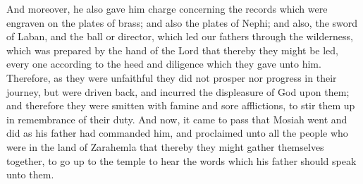 And moreover, he also gave him charge concerning the records which were engraven on the plates of brass; and also the plates of Nephi; and also, the sword of Laban, and the ball or director, which led our fathers through the wilderness, which was prepared by the hand of the Lord that thereby they might be led, every one according to the heed and diligence which they gave unto him.
\bverse \iffalse Therefore, as they were unfaithful they did not prosper nor progress in their journey, but were driven back, and incurred the displeasure of God upon them; and therefore they were smitten with famine and sore afflictions, to stir them up in remembrance of their duty. \fi
Therefore, as they were unfaithful they did not prosper nor progress in their journey, but were driven back, and incurred the displeasure of God upon them; and therefore they were smitten with famine and sore afflictions, to stir them up in remembrance of their duty.
\bverse \iffalse And now, it came to pass that Mosiah went and did as his father had commanded him, and proclaimed unto all the people who were in the land of Zarahemla that thereby they might gather themselves together, to go up to the temple to hear the words which his father should speak unto them. \fi
And now, it came to pass that Mosiah went and did as his father had commanded him, and proclaimed unto all the people who were in the land of Zarahemla that thereby they might gather themselves together, to go up to the temple to hear the words which his father should speak unto them.


